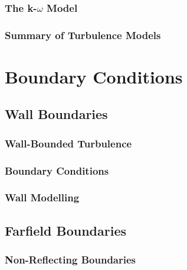 \subsection{The k-$\omega$ Model}
\subsection{Summary of Turbulence Models}

\chapter{Boundary Conditions}
\section{Wall Boundaries}
\subsection{Wall-Bounded Turbulence}
\subsection{Boundary Conditions}
\subsection{Wall Modelling}
\section{Farfield Boundaries}
\subsection{Non-Reflecting Boundaries}